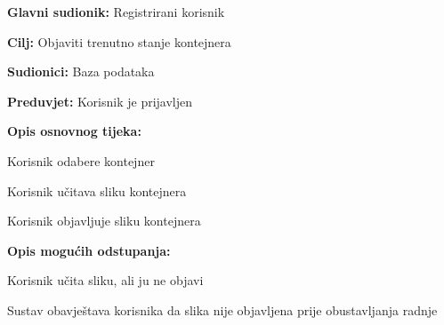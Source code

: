 			\noindent {}
			\begin{packed_item}
				
				\item \textbf{Glavni sudionik:} Registrirani korisnik
				\item  \textbf{Cilj:} Objaviti trenutno stanje kontejnera
				\item  \textbf{Sudionici:} Baza podataka
				\item  \textbf{Preduvjet:} Korisnik je prijavljen
				\item  \textbf{Opis osnovnog tijeka:}
				
				\item[] \begin{packed_enum}
					
					\item Korisnik odabere kontejner
					\item Korisnik učitava sliku kontejnera
					\item Korisnik objavljuje sliku kontejnera
					
				\end{packed_enum}
				
				\item  \textbf{Opis mogućih odstupanja:}
				
				\item[] \begin{packed_item}
					
					\item[2.a] Korisnik učita sliku, ali ju ne objavi
					\item[] \begin{packed_enum}
						
						\item Sustav obavještava korisnika da slika nije objavljena prije obustavljanja radnje
						
					\end{packed_enum}
					
				\end{packed_item}
			\end{packed_item}
			
